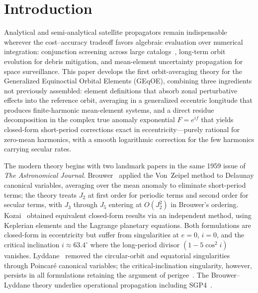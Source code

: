 \section{Introduction}
\label{sec:intro}

Analytical and semi-analytical satellite propagators remain indispensable
wherever the cost--accuracy tradeoff favors algebraic evaluation over
numerical integration: conjunction screening across large
catalogs~\cite{rivero2025,rivero2025b}, long-term orbit evolution for debris
mitigation, and mean-element uncertainty propagation for space
surveillance.  This paper develops the first orbit-averaging theory for
the Generalized Equinoctial Orbital Elements (GEqOE), combining three
ingredients not previously assembled: element definitions that absorb
zonal perturbative effects into the reference orbit, averaging in a
generalized eccentric longitude that produces finite-harmonic mean-element
systems, and a direct residue decomposition in the complex true anomaly
exponential $F = e^{if}$ that yields closed-form short-period corrections exact in
eccentricity---purely rational for zero-mean harmonics, with a smooth
logarithmic correction for the few harmonics carrying secular rates.

The modern theory begins with two landmark papers in the same 1959 issue of
\emph{The Astronomical Journal}.  Brouwer~\cite{brouwer1959} applied the
Von~Zeipel method to Delaunay canonical variables, averaging over the mean
anomaly to eliminate short-period terms; the theory treats $J_2$ at first
order for periodic terms and second order for secular terms, with $J_3$
through $J_5$ entering at $O(J_2^2)$ in Brouwer's ordering.
Kozai~\cite{kozai1959} obtained equivalent closed-form
results via an independent method, using Keplerian elements and the
Lagrange planetary equations.
Both formulations are closed-form in eccentricity but suffer from
singularities at $e = 0$, $i = 0$, and the critical inclination
$i \approx 63.4^\circ$ where the long-period divisor $(1 - 5\cos^2 i)$
vanishes.  Lyddane~\cite{lyddane1963} removed the circular-orbit and
equatorial singularities through Poincar\'e canonical variables; the
critical-inclination singularity, however, persists in all formulations
retaining the argument of perigee~\cite{brouwer1959}.
The Brouwer--Lyddane theory underlies operational
propagation including SGP4~\cite{spacetrack1980,vallado2006}.

